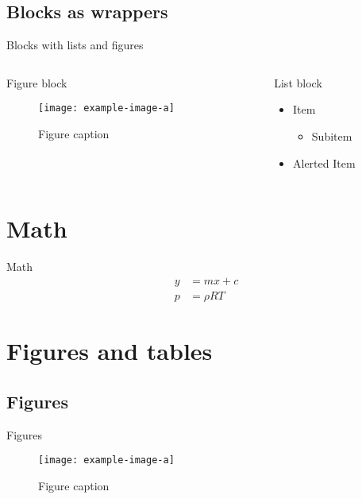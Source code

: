 \subsection{Blocks as wrappers}
\begin{frame}{Blocks with lists and figures}
    \begin{columns}
        \begin{column}{0.45\linewidth}
            \begin{block}{Figure block}
                \begin{figure}
                    \texttt{[image: example-image-a]}
                    \caption{Figure caption}
                \end{figure}
            \end{block}
        \end{column}
        \begin{column}{0.45\linewidth}
            \begin{block}{List block}
                \begin{itemize}
                    \item Item
                    \begin{itemize}
                        \item Subitem
                    \end{itemize}
                    \item \alert{Alerted Item}
                \end{itemize}
            \end{block}
        \end{column}
    \end{columns}
\end{frame}

\section{Math}
\begin{frame}{Math}
    \begin{align}
        y &= mx + c\\
        p &= \rho R T
    \end{align}
\end{frame}

\section{Figures and tables}
\subsection{Figures}
\begin{frame}{Figures}
    \begin{figure}
        \texttt{[image: example-image-a]}
        \caption{Figure caption}
    \end{figure}
\end{frame}

